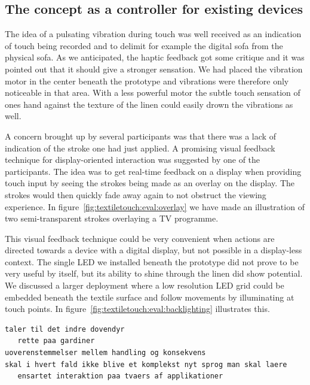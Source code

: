 \subsection{The concept as a controller for existing devices}
\todo{\dots}
\blank

The idea of a pulsating vibration during touch was well received as an indication of touch being recorded and to delimit for example the digital sofa from the physical sofa. 
As we anticipated, the haptic feedback got some critique and it was pointed out that it should give a stronger sensation.
We had placed the vibration motor in the center beneath the prototype and vibrations were therefore only noticeable in that area.
With a less powerful motor the subtle touch sensation of ones hand against the texture of the linen could easily drown the vibrations as well.

A concern brought up by several participants was that there was a lack of indication of the stroke one had just applied.
A promising visual feedback technique for display-oriented interaction was suggested by one of the participants.
The idea was to get real-time feedback on a display when providing touch input by seeing the strokes being made as an overlay on the display.
The strokes would then quickly fade away again to not obstruct the viewing experience. 
In figure~\ref{fig:textiletouch:eval:overlay} we have made an illustration of two semi-transparent strokes overlaying a TV programme. 

This visual feedback technique could be very convenient when actions are directed towards a device with a digital display, but not possible in a display-less context.
The single LED we installed beneath the prototype did not prove to be very useful by itself, but its ability to shine through the linen did show potential.
We discussed a larger deployment where a low resolution LED grid could be embedded beneath the textile surface and follow movements by illuminating at touch points.
In figure~\ref{fig:textiletouch:eval:backlighting} illustrates this.

\begin{verbatim}
taler til det indre dovendyr
   rette paa gardiner
uoverenstemmelser mellem handling og konsekvens
skal i hvert fald ikke blive et komplekst nyt sprog man skal laere
   ensartet interaktion paa tvaers af applikationer
\end{verbatim}

